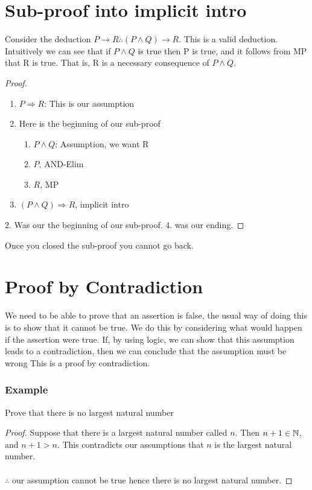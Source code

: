 \documentclass[../MATH-2000-Notes.tex]{subfiles}
\begin{document}
\section{Sub-proof into implicit intro}
Consider the deduction \(P \rightarrow R \therefore (P \wedge Q) \rightarrow R\). This is a valid deduction. Intuitively we can see that if \(P\wedge Q\) is true then P is true, and it follows from MP that R is true. That is, R is a necessary consequence of \(P\wedge Q\).
\begin{proof}~\\
    \begin{enumerate}
        \item \(P \Rightarrow R\): This is our assumption
        \item Here is the beginning of our sub-proof\begin{enumerate}
            \item \(P \wedge Q\): Assumption, we want R\\
            \item \(P\), AND-Elim
            \item \(R\), MP
        \end{enumerate}
        \item \((P \wedge Q) \Rightarrow R\), implicit intro
    \end{enumerate}
    2. Was our the beginning of our sub-proof. 4. was our ending.
\end{proof}
\begin{Note}
    Once you closed the sub-proof you cannot go back.
\end{Note}
\section{Proof by Contradiction}
We need to be able to prove that an assertion is false, the usual way of doing this is to show that it cannot be true. We do this by considering what would happen if the assertion were true. If, by using logic, we can show that this assumption leads to a contradiction, then we can conclude that the assumption must be wrong This is a proof by contradiction.
\subsubsection{Example}
Prove that there is no largest natural number
\begin{proof}
    Suppose that there is a largest natural number called \(n\).
    Then \(n + 1 \in \mathbb{N}\), and \(n+1 > n\). This contradicts our assumptions that \(n \) is the largest natural number.
    \\~\\ 
    \(\therefore\) our assumption cannot be true hence there is no largest natural number.
\end{proof}
\end{document}
